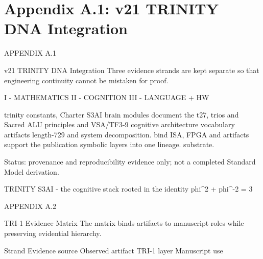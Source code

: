 
\section{Appendix A.1: v21 TRINITY DNA Integration}

APPENDIX A.1

                 v21 TRINITY DNA Integration
      Three evidence strands are kept separate so that engineering continuity cannot be
                                    mistaken for proof.

  I - MATHEMATICS                         II - COGNITION                                         III - LANGUAGE + HW

  trinity constants, Charter              S3AI brain modules document the                        t27, trios and Sacred ALU
  principles and VSA/TF3-9                cognitive architecture vocabulary                      artifacts
  length-729                              and system decomposition.                              bind ISA, FPGA and
  artifacts support the                                                                          publication
  symbolic                                                                                       layers into one lineage.
  substrate.

      Status: provenance and reproducibility evidence only; not a completed Standard Model
                                           derivation.

                           TRINITY S3AI - the cognitive stack rooted in the identity phi^2 + phi^-2 = 3

                                                            APPENDIX A.2

                                 TRI-1 Evidence Matrix
        The matrix binds artifacts to manuscript roles while preserving evidential hierarchy.

       Strand      Evidence source                 Observed artifact                    TRI-1 layer                    Manuscript use